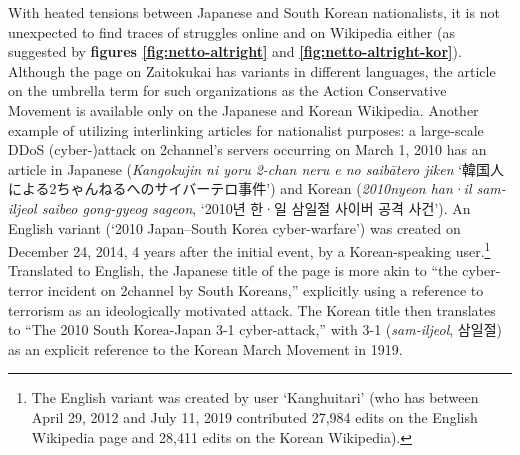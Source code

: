 \documentclass[10pt,british,A4paper,,openany]{memoir}
\begin{document}
With heated tensions between Japanese and South Korean nationalists, it
is not unexpected to find traces of struggles online and on Wikipedia
either (as suggested by \textbf{figures \ref{fig:netto-altright}} and
\textbf{\ref{fig:netto-altright-kor}}). Although the page on Zaitokukai
has variants in different languages, the article on the umbrella term
for such organizations as the Action Conservative Movement is available
only on the Japanese and Korean Wikipedia. Another example of utilizing
interlinking articles for nationalist purposes: a large-scale DDoS
(cyber-)attack on 2channel's servers occurring on March 1, 2010 has an
article in Japanese (\emph{Kangokujin ni yoru 2-chan neru e no saibātero
jiken} `韓国人による2ちゃんねるへのサイバーテロ事件') and Korean
(\emph{2010nyeon han·il sam-iljeol saibeo gong-gyeog sageon}, `2010년
한·일 삼일절 사이버 공격 사건'). An English variant (`2010 Japan--South
Korea cyber-warfare') was created on December 24, 2014, 4 years after
the initial event, by a Korean-speaking user.\footnote{The English
  variant was created by user `Kanghuitari' (who has between April 29,
  2012 and July 11, 2019 contributed 27,984 edits on the English
  Wikipedia page and 28,411 edits on the Korean Wikipedia).} Translated
to English, the Japanese title of the page is more akin to ``the
cyber-terror incident on 2channel by South Koreans,'' explicitly using a
reference to terrorism as an ideologically motivated attack. The Korean
title then translates to ``The 2010 South Korea-Japan 3-1
cyber-attack,'' with 3-1 (\emph{sam-iljeol}, 삼일절) as an explicit
reference to the Korean March  Movement in 1919.
\end{document}
